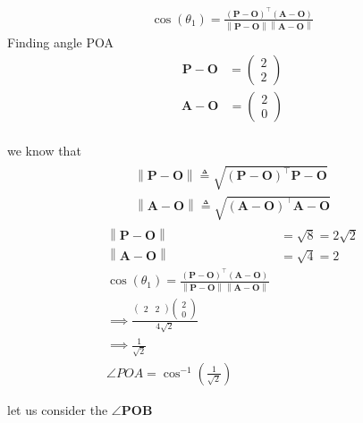 \documentclass[12pt,-letter paper]{article}
\let\vec\mathbf{}
\let\vec\mathbf{}
\let\vec\mathbf{}
\providecommand{\brak}[1]{\ensuremath{\left(#1\right)}}
\providecommand{\norm}[1]{\left\lVert#1\right\rVert}
\newcommand{\myvec}[1]{\ensuremath{\begin{pmatrix}#1\end{pmatrix}}}
\begin{document}
\begin{enumerate}
    \begin{align}
	\cos{\brak{\theta_1}} = \frac{(\vec{P}-\vec{O})^\top(\vec{A}-\vec{O})}{\norm{\vec{P}-\vec{O}}\norm{\vec{A}-\vec{O}}}
\end{align}
Finding angle POA  \\
\begin{align}
	\vec{P}-\vec{O} &=\myvec{2\\2}
\end{align}
\begin{align}
	\vec{A}-\vec{O} &=\myvec{2\\0}
\end{align}
\\we know that 
 \begin{align}
 \begin{split}
     \norm{\vec{P}-\vec{O}} \triangleq \sqrt{\brak{\vec{P}-\vec{O}}^{\top}{\vec{P}-\vec{O}}}\\
     \norm{\vec{A}-\vec{O}} \triangleq \sqrt{\brak{\vec{A}-\vec{O}}^{\top}{\vec{A}-\vec{O}}}
 \end{split}
\end{align}
\begin{align}
	\norm{\vec{P}-\vec{O}} &= \sqrt{8} = 2\sqrt{2} \\
	\norm{\vec{A}-\vec{O}} &= \sqrt{4} = 2\\
 \cos{\brak{\theta_1}} = \frac{(\vec{P}-\vec{O})^\top(\vec{A}-\vec{O})}{\norm{\vec{P}-\vec{O}}\norm{\vec{A}-\vec{O}}}\\
 \implies \frac{\myvec{2&2}\myvec{2\\0} }{4\sqrt{2}}\\
 \implies \frac{1}{\sqrt{2}}\\
	\angle POA = \cos^{-1}\brak{{\frac{1}{\sqrt{2}}}}
\end{align}


let us consider the $\angle \vec{POB}$ 
  

\end{enumerate}
\end{document}
